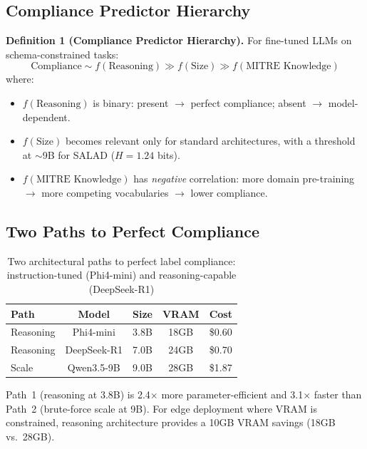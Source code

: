\documentclass[review,3p]{elsarticle}
\begin{document}
\subsection{Compliance Predictor Hierarchy}

\noindent\textbf{Definition 1 (Compliance Predictor Hierarchy).} For fine-tuned LLMs on schema-constrained tasks:
\begin{equation}
\text{Compliance} \sim f(\text{Reasoning}) \gg f(\text{Size}) \gg f(\text{MITRE Knowledge})
\end{equation}
where:
\begin{itemize}
\item $f(\text{Reasoning})$ is binary: present $\to$ perfect compliance; absent $\to$ model-dependent.
\item $f(\text{Size})$ becomes relevant only for standard architectures, with a threshold at $\sim$9B for SALAD ($H = 1.24$ bits).
\item $f(\text{MITRE Knowledge})$ has \emph{negative} correlation: more domain pre-training $\to$ more competing vocabularies $\to$ lower compliance.
\end{itemize}

\subsection{Two Paths to Perfect Compliance}

\begin{table}[!ht]
\centering
\caption{Two architectural paths to perfect label compliance: instruction-tuned (Phi4-mini) and reasoning-capable (DeepSeek-R1)}
\label{tab:paths}
\begin{tabular}{lcccc}
\toprule
\textbf{Path} & \textbf{Model} & \textbf{Size} & \textbf{VRAM} & \textbf{Cost} \\
\midrule
Reasoning & Phi4-mini & 3.8B & 18GB & \$0.60 \\
Reasoning & DeepSeek-R1 & 7.0B & 24GB & \$0.70 \\
Scale & Qwen3.5-9B & 9.0B & 28GB & \$1.87 \\
\bottomrule
\end{tabular}
\end{table}

Path~1 (reasoning at 3.8B) is 2.4$\times$ more parameter-efficient and 3.1$\times$ faster than Path~2 (brute-force scale at 9B). For edge deployment where VRAM is constrained, reasoning architecture provides a 10GB VRAM savings (18GB vs.\ 28GB).
\end{document}
